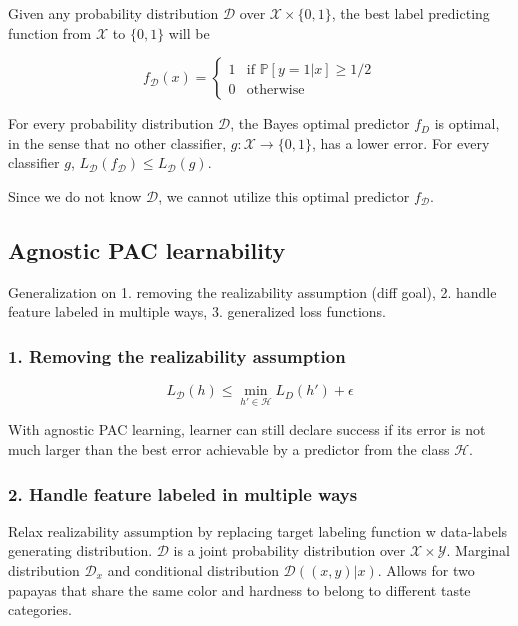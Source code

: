 Given any probability distribution $\mathcal{D}$ over $\mathcal{X} \times \{0, 1\}$, the best label predicting function from $\mathcal{X}$ to $\{0, 1\}$ will be

\begin{equation*}
    f_{\mathcal{D}}(x) = 
    \begin{cases}
    1 & \text{if } \mathbb{P}[y = 1 | x] \geq 1/2 \\
    0 & \text{otherwise}
    \end{cases}
\end{equation*}

For every probability distribution $\mathcal{D}$, the Bayes optimal predictor $f_D$ is optimal, in the sense that no other classifier, $g : \mathcal{X} \rightarrow \{0, 1\}$, has a lower error. For every classifier $g$, $L_{\mathcal{D}}(f_{\mathcal{D}}) \leq L_{\mathcal{D}}(g)$.

Since we do not know $\mathcal{D}$, we cannot utilize this optimal predictor $f_{\mathcal{D}}$.

\subsection{Agnostic PAC learnability}

Generalization on 1. removing the realizability assumption (diff goal), 2. handle feature labeled in multiple ways, 3. generalized loss functions.

\subsubsection{1. Removing the realizability assumption}

$$L_{\mathcal{D}}(h) \leq \min_{h' \in \mathcal{H}} L_D(h') + \epsilon$$

With agnostic PAC learning, learner can still declare success if its error is not much larger than the best error achievable by a predictor from the class $\mathcal{H}$.

\subsubsection{2. Handle feature labeled in multiple ways}

Relax realizability assumption by replacing target labeling function w data-labels generating distribution. $\mathcal{D}$ is a joint probability distribution over $\mathcal{X} \times \mathcal{Y}$. Marginal distribution $\mathcal{D}_x$ and conditional distribution $\mathcal{D}((x, y)|x)$. Allows for two papayas that share the same color and hardness to belong to different taste categories.

